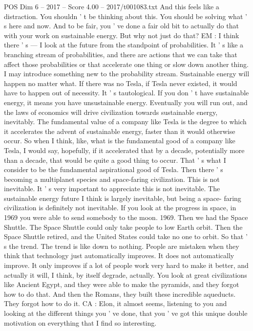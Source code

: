 \begin{textsample}{POS Dim 6 – 2017 – Score 4.00 – 2017/t001083.txt}
And this feels like a distraction.
You shouldn ' t be thinking about this.
You should be solving what ' s here and now.
And to be fair, you ' ve done a fair old bit to actually do that with your work on sustainable energy.
But why not just do that?
EM : I think there ' s — I look at the future from the standpoint of probabilities.
It ' s like a branching stream of probabilities, and there are actions that we can take that affect those probabilities or that accelerate one thing or slow down another thing.
I may introduce something new to the probability stream.
Sustainable energy will happen no matter what.
If there was no Tesla, if Tesla never existed, it would have to happen out of necessity.
It ' s tautological.
If you don ' t have sustainable energy, it means you have unsustainable energy.
Eventually you will run out, and the laws of economics will drive civilization towards sustainable energy, inevitably.
The fundamental value of a company like Tesla is the degree to which it accelerates the advent of sustainable energy, faster than it would otherwise occur.
So when I think, like, what is the fundamental good of a company like Tesla, I would say, hopefully, if it accelerated that by a decade, potentially more than a decade, that would be quite a good thing to occur.
That ' s what I consider to be the fundamental aspirational good of Tesla.
Then there ' s becoming a multiplanet species and space-faring civilization.
This is not inevitable.
It ' s very important to appreciate this is not inevitable.
The sustainable energy future I think is largely inevitable, but being a space- faring civilization is definitely not inevitable.
If you look at the progress in space, in 1969 you were able to send somebody to the moon. 1969.
Then we had the Space Shuttle.
The Space Shuttle could only take people to low Earth orbit.
Then the Space Shuttle retired, and the United States could take no one to orbit.
So that ' s the trend.
The trend is like down to nothing.
People are mistaken when they think that technology just automatically improves.
It does not automatically improve.
It only improves if a lot of people work very hard to make it better, and actually it will, I think, by itself degrade, actually.
You look at great civilizations like Ancient Egypt, and they were able to make the pyramids, and they forgot how to do that.
And then the Romans, they built these incredible aqueducts.
They forgot how to do it.
CA : Elon, it almost seems, listening to you and looking at the different things you ' ve done, that you ' ve got this unique double motivation on everything that I find so interesting.

\end{textsample}
